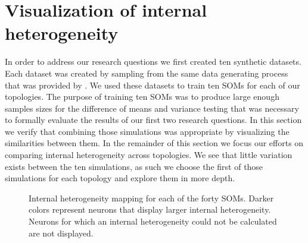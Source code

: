 \section{Visualization of internal heterogeneity}
\label{rdq3}
In order to address our research questions we first created ten synthetic
datasets.  Each dataset was created by sampling from the same data generating process
that was provided by \cite{wu2006}.  We used these datasets to train ten
SOMs for each of our topologies.  The purpose of training ten SOMs was to
produce large enough samples sizes for the difference of means and variance
testing that was necessary to formally evaluate the results of our first two
research questions.  In this section we verify that combining those
simulations was appropriate by visualizing the similarities between them.
In the remainder of this section we focus our efforts on comparing internal
heterogeneity across
topologies.  We see that little variation exists between the ten
simulations, as such we choose the first of those simulations for each topology and
explore them in more depth.

\begin{figure}[ht]
\centering
\begin{minipage}{\textwidth}
\caption{Internal heterogeneity mapping for each of the forty SOMs. Darker colors
represent neurons that display larger internal heterogeneity. Neurons for which
an internal heterogeneity could not be calculated are not displayed.}
\label{ten}
\end{minipage}
\end{figure}

